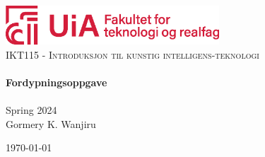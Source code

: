 \begin{titlepage}
    \vbox{ }

    \vbox{ }

    \begin{center}
        \includegraphics[width=0.6\textwidth]{Figures/Frontpage/tekreal}\\[4cm]
        \textsc{\Large IKT115 - Introduksjon til kunstig intelligens-teknologi}\\[0.7cm]

        \noindent\makebox[\linewidth]{\rule{.7\paperwidth}{.6pt}}\\[0.7cm]
        { \huge \bfseries Fordypningsoppgave}\\[0.25cm]
        \noindent\makebox[\linewidth]{\rule{.7\paperwidth}{.6pt}}\\[0.7cm]
        \large{Spring 2024}\\[1.2cm]
        \vfill
        \large
        Gormery K. Wanjiru

        {\large \today}
    \end{center}
\end{titlepage}